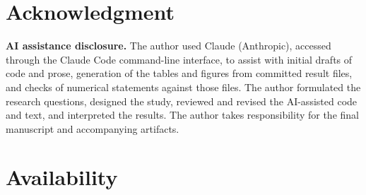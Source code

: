\documentclass[acmsmall,screen,review]{acmart}
\begin{document}
\section{Acknowledgment}

\textbf{AI assistance disclosure.} The author used Claude (Anthropic), accessed through the Claude Code command-line interface, to assist with initial drafts of code and prose, generation of the tables and figures from committed result files, and checks of numerical statements against those files. The author formulated the research questions, designed the study, reviewed and revised the AI-assisted code and text, and interpreted the results. The author takes responsibility for the final manuscript and accompanying artifacts.


\section{Availability}
\end{document}
